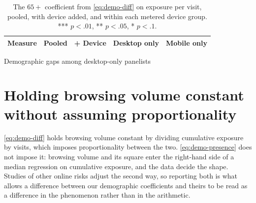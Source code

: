 \documentclass[12pt, letterpaper]{article}
\begin{document}
\begin{table}[ht]
\centering
\caption{The $65+$ coefficient from \cref{eq:demo-diff} on exposure per visit, pooled, with device added, and within each metered device group. *** $p<.01$, ** $p<.05$, * $p<.1$.}
\label{tab:device_age_gradient}
\begin{adjustbox}{max width=\textwidth}
\begin{tabular}{lrrrr}
\toprule
Measure & Pooled & + Device & Desktop only & Mobile only \\
\midrule

\bottomrule
\end{tabular}
\end{adjustbox}
\end{table}


\begin{table}[ht]
\centering
\caption{Demographic gaps among desktop-only panelists}
\label{tab:desktop_only}
\caption*{\textit{Note:} OLS with Huber-White (HC1) standard errors, the
specification of \cref{eq:demo-diff}. ``All'' is every panelist with a metered
device, ``Desktop'' the $\DesktopOnlyN$ whose logged activity is desktop only.
Rates are per \emph{scanned} visit in both columns, so they are not comparable
to \cref{tab:demo_differences_exposure_rate}, which divides by all visits.
$^{***}p<0.01$, $^{**}p<0.05$, $^{*}p<0.10$.}
\end{table}

\clearpage
\FloatBarrier
\section{Holding browsing volume constant without assuming proportionality}
\label{sm:presence}
 
\cref{eq:demo-diff} holds browsing volume constant by dividing cumulative exposure by visits, which imposes proportionality between the two.
\cref{eq:demo-presence} does not impose it: browsing volume and its square enter the right-hand side of a median regression on cumulative exposure, and the data decide the shape. Studies of other online risks adjust the second way, so reporting both is what allows a difference between our demographic coefficients and theirs to be read as a difference in the phenomenon rather than in the arithmetic.
 
\end{document}
